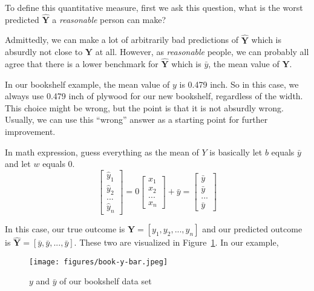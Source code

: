\documentclass[
	letterpaper
]{article}
\begin{document}
To define this quantitative measure, first we ask this question, what is the worst predicted $\mathbf{\hat Y}$ a \textit{reasonable} person can make?

Admittedly, we can make a lot of arbitrarily bad predictions of $\mathbf{\hat Y}$ which is absurdly not close to $\mathbf{Y}$ at all.
However, as \textit{reasonable} people, we can probably all agree that there is a lower benchmark for $\mathbf{\hat Y}$ which is $\bar y$, the mean value of $\mathbf{Y}$.

In our bookshelf example, the mean value of $y$ is 0.479 inch.
So in this case, we always use 0.479 inch of plywood for our new bookshelf, regardless of the width.
This choice might be wrong, but the point is that it is not absurdly wrong.
Usually, we can use this ``wrong'' answer as a starting point for further improvement.

In math expression, guess everything as the mean of $Y$ is basically let $b$ equals $\bar y$ and let $w$ equals 0.
\begin{equation}
\begin{bmatrix}\hat y_1 \\ \hat y_2 \\ ... \\ \hat y_n\end{bmatrix}
 = 0\begin{bmatrix} x_1 \\  x_2 \\ ... \\ x_n\end{bmatrix}+\bar y
=
\begin{bmatrix} \bar y \\ \bar y \\ ... \\ \bar y\end{bmatrix}
\end{equation}

In this case, our true outcome is $\mathbf{Y} = [y_1, y_2, ..., y_n]$ and our predicted outcome is $\mathbf{\hat Y} = [\bar y, \bar y, ..., \bar y]$.
These two are visualized in Figure~\ref{fig:book-y-bar}.
In our example, 
\begin{figure}[htbp]
	\centering
	\texttt{[image: figures/book-y-bar.jpeg]}
	\caption{$y$ and $\bar y$ of our bookshelf data set}
	\label{fig:book-y-bar}
\end{figure}
\end{document}

